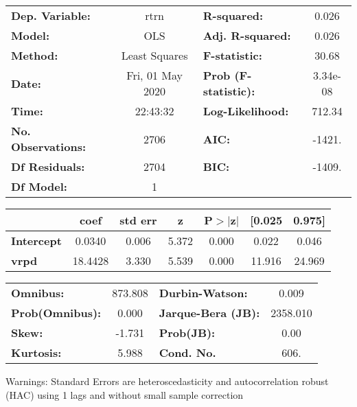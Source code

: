 \begin{center}
\begin{tabular}{lclc}
\toprule
\textbf{Dep. Variable:}    &       rtrn       & \textbf{  R-squared:         } &     0.026   \\
\textbf{Model:}            &       OLS        & \textbf{  Adj. R-squared:    } &     0.026   \\
\textbf{Method:}           &  Least Squares   & \textbf{  F-statistic:       } &     30.68   \\
\textbf{Date:}             & Fri, 01 May 2020 & \textbf{  Prob (F-statistic):} &  3.34e-08   \\
\textbf{Time:}             &     22:43:32     & \textbf{  Log-Likelihood:    } &    712.34   \\
\textbf{No. Observations:} &        2706      & \textbf{  AIC:               } &    -1421.   \\
\textbf{Df Residuals:}     &        2704      & \textbf{  BIC:               } &    -1409.   \\
\textbf{Df Model:}         &           1      & \textbf{                     } &             \\
\bottomrule
\end{tabular}
\begin{tabular}{lcccccc}
                   & \textbf{coef} & \textbf{std err} & \textbf{z} & \textbf{P$> |$z$|$} & \textbf{[0.025} & \textbf{0.975]}  \\
\midrule
\textbf{Intercept} &       0.0340  &        0.006     &     5.372  &         0.000        &        0.022    &        0.046     \\
\textbf{vrpd}      &      18.4428  &        3.330     &     5.539  &         0.000        &       11.916    &       24.969     \\
\bottomrule
\end{tabular}
\begin{tabular}{lclc}
\textbf{Omnibus:}       & 873.808 & \textbf{  Durbin-Watson:     } &    0.009  \\
\textbf{Prob(Omnibus):} &   0.000 & \textbf{  Jarque-Bera (JB):  } & 2358.010  \\
\textbf{Skew:}          &  -1.731 & \textbf{  Prob(JB):          } &     0.00  \\
\textbf{Kurtosis:}      &   5.988 & \textbf{  Cond. No.          } &     606.  \\
\bottomrule
\end{tabular}
\end{center}

Warnings: \newline
 [1] Standard Errors are heteroscedasticity and autocorrelation robust (HAC) using 1 lags and without small sample correction